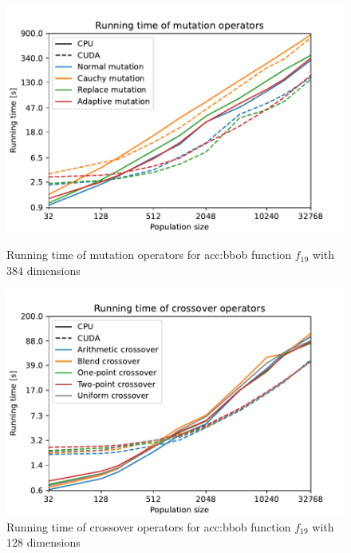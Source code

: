 \begin{figure}
    \begin{minipage}[t]{0.48\textwidth}
        \includegraphics[width=\textwidth]{img/runs/time_es_mutation_with_legend.pdf}
        \caption[Running time of mutation operators]{Running time of mutation operators for \acrshort{acc:bbob} function $f_{19}$ with $384$ dimensions}
        \label{fig:esmuttime}
    \end{minipage}
    \hfill
    \begin{minipage}[t]{0.48\textwidth}
        \includegraphics[width=\textwidth]{img/runs/time_es_crossover_with_legend.pdf}
        \caption[Running time of crossover operators]{Running time of crossover operators for \acrshort{acc:bbob} function $f_{19}$ with $128$ dimensions}
        \label{ref:escrosstime}
    \end{minipage}
\end{figure}

